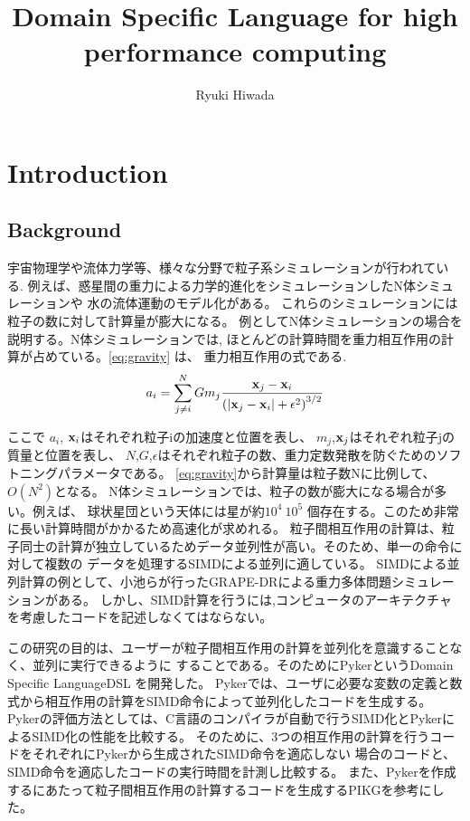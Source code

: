 \documentclass[ams, a4j]{U-AizuGT}
\author{Ryuki Hiwada}
\title{Domain Specific Language for high performance computing}
\begin{document}
\maketitle
\begin{abstract}

\end{abstract}
\section{Introduction}


\subsection{Background}

宇宙物理学や流体力学等、様々な分野で粒子系シミュレーションが行われている.
例えば、惑星間の重力による力学的進化をシミュレーションしたN体シミュレーションや
水の流体運動のモデル化がある。
これらのシミュレーションには粒子の数に対して計算量が膨大になる。
例としてN体シミュレーションの場合を説明する。N体シミュレーションでは,
ほとんどの計算時間を重力相互作用の計算が占めている。\eqref{eq:gravity} は、
重力相互作用の式である.
\begin{equation}
a_i = \sum_{\substack{j \neq i}}^{N} G m_j \frac{\vb{x}_j - \vb{x}_i}{\left( \left| \vb{x}_j - \vb{x}_i \right| + \epsilon^2 \right)^{3/2}\label{eq:gravity}}
\end{equation}

ここで $a_i$, $\vb{x}_i$はそれぞれ粒子iの加速度と位置を表し、
$m_j$,$\vb{x}_j$はそれぞれ粒子jの質量と位置を表し、
$N$,$G$,$\epsilon$はそれぞれ粒子の数、重力定数発散を防ぐためのソフトニングパラメータである。
\eqref{eq:gravity}から計算量は粒子数Nに比例して、\begin{math}O(N^2) \end{math}となる。
N体シミュレーションでは、粒子の数が膨大になる場合が多い。例えば、
球状星団という天体には星が約$10^4 ~ 10^5 $ 個存在する。このため非常に長い計算時間がかかるため高速化が求めれる。
粒子間相互作用の計算は、粒子同士の計算が独立しているためデータ並列性が高い。そのため、単一の命令に対して複数の
データを処理するSIMDによる並列に適している。
SIMDによる並列計算の例として、小池らが行ったGRAPE-DR\cite{GRAPE-explain-thesis}による重力多体問題シミュレーションがある。\cite{GRAPE-DR-thesis}
しかし、SIMD計算を行うには,コンピュータのアーキテクチャを考慮したコードを記述しなくてはならない。

この研究の目的は、ユーザーが粒子間相互作用の計算を並列化を意識することなく、並列に実行できるように
することである。そのためにPykerというDomain Specific Language\lparen DSL \rparen を開発した。
Pykerでは、ユーザに必要な変数の定義と数式から相互作用の計算をSIMD命令によって並列化したコードを生成する。
Pykerの評価方法としては、C言語のコンパイラが自動で行うSIMD化とPykerによるSIMD化の性能を比較する。
そのために、3つの相互作用の計算を行うコードをそれぞれにPykerから生成されたSIMD命令を適応しない
場合のコードと、SIMD命令を適応したコードの実行時間を計測し比較する。
また、Pykerを作成するにあたって粒子間相互作用の計算するコードを生成するPIKGを参考にした。
\end{document}
